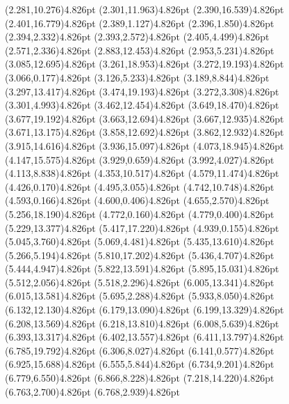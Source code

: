 \documentclass[10pt]{article}
\begin{document}
{{\qdisk(2.281,10.276){4.826pt}%
\qdisk(2.301,11.963){4.826pt}%
\qdisk(2.390,16.539){4.826pt}%
\qdisk(2.401,16.779){4.826pt}%
\qdisk(2.389,1.127){4.826pt}%
\qdisk(2.396,1.850){4.826pt}%
\qdisk(2.394,2.332){4.826pt}%
\qdisk(2.393,2.572){4.826pt}%
\qdisk(2.405,4.499){4.826pt}%
\qdisk(2.571,2.336){4.826pt}%
\qdisk(2.883,12.453){4.826pt}%
\qdisk(2.953,5.231){4.826pt}%
\qdisk(3.085,12.695){4.826pt}%
\qdisk(3.261,18.953){4.826pt}%
\qdisk(3.272,19.193){4.826pt}%
\qdisk(3.066,0.177){4.826pt}%
\qdisk(3.126,5.233){4.826pt}%
\qdisk(3.189,8.844){4.826pt}%
\qdisk(3.297,13.417){4.826pt}%
\qdisk(3.474,19.193){4.826pt}%
\qdisk(3.272,3.308){4.826pt}%
\qdisk(3.301,4.993){4.826pt}%
\qdisk(3.462,12.454){4.826pt}%
\qdisk(3.649,18.470){4.826pt}%
\qdisk(3.677,19.192){4.826pt}%
\qdisk(3.663,12.694){4.826pt}%
\qdisk(3.667,12.935){4.826pt}%
\qdisk(3.671,13.175){4.826pt}%
\qdisk(3.858,12.692){4.826pt}%
\qdisk(3.862,12.932){4.826pt}%
\qdisk(3.915,14.616){4.826pt}%
\qdisk(3.936,15.097){4.826pt}%
\qdisk(4.073,18.945){4.826pt}%
\qdisk(4.147,15.575){4.826pt}%
\qdisk(3.929,0.659){4.826pt}%
\qdisk(3.992,4.027){4.826pt}%
\qdisk(4.113,8.838){4.826pt}%
\qdisk(4.353,10.517){4.826pt}%
\qdisk(4.579,11.474){4.826pt}%
\qdisk(4.426,0.170){4.826pt}%
\qdisk(4.495,3.055){4.826pt}%
\qdisk(4.742,10.748){4.826pt}%
\qdisk(4.593,0.166){4.826pt}%
\qdisk(4.600,0.406){4.826pt}%
\qdisk(4.655,2.570){4.826pt}%
\qdisk(5.256,18.190){4.826pt}%
\qdisk(4.772,0.160){4.826pt}%
\qdisk(4.779,0.400){4.826pt}%
\qdisk(5.229,13.377){4.826pt}%
\qdisk(5.417,17.220){4.826pt}%
\qdisk(4.939,0.155){4.826pt}%
\qdisk(5.045,3.760){4.826pt}%
\qdisk(5.069,4.481){4.826pt}%
\qdisk(5.435,13.610){4.826pt}%
\qdisk(5.266,5.194){4.826pt}%
\qdisk(5.810,17.202){4.826pt}%
\qdisk(5.436,4.707){4.826pt}%
\qdisk(5.444,4.947){4.826pt}%
\qdisk(5.822,13.591){4.826pt}%
\qdisk(5.895,15.031){4.826pt}%
\qdisk(5.512,2.056){4.826pt}%
\qdisk(5.518,2.296){4.826pt}%
\qdisk(6.005,13.341){4.826pt}%
\qdisk(6.015,13.581){4.826pt}%
\qdisk(5.695,2.288){4.826pt}%
\qdisk(5.933,8.050){4.826pt}%
\qdisk(6.132,12.130){4.826pt}%
\qdisk(6.179,13.090){4.826pt}%
\qdisk(6.199,13.329){4.826pt}%
\qdisk(6.208,13.569){4.826pt}%
\qdisk(6.218,13.810){4.826pt}%
\qdisk(6.008,5.639){4.826pt}%
\qdisk(6.393,13.317){4.826pt}%
\qdisk(6.402,13.557){4.826pt}%
\qdisk(6.411,13.797){4.826pt}%
\qdisk(6.785,19.792){4.826pt}%
\qdisk(6.306,8.027){4.826pt}%
\qdisk(6.141,0.577){4.826pt}%
\qdisk(6.925,15.688){4.826pt}%
\qdisk(6.555,5.844){4.826pt}%
\qdisk(6.734,9.201){4.826pt}%
\qdisk(6.779,6.550){4.826pt}%
\qdisk(6.866,8.228){4.826pt}%
\qdisk(7.218,14.220){4.826pt}%
\qdisk(6.763,2.700){4.826pt}%
\qdisk(6.768,2.939){4.826pt}%
}}
\end{document}
